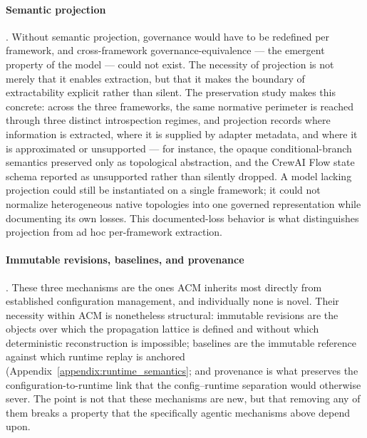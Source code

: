 \documentclass[10pt]{article}
\begin{document}
\paragraph{Semantic projection}. Without semantic projection, governance would have to be redefined per framework, and cross-framework governance-equivalence — the emergent property of the model — could not exist. The necessity of projection is not merely that it enables extraction, but that it makes the boundary of extractability explicit rather than silent. The preservation study makes this concrete: across the three frameworks, the same normative perimeter is reached through three distinct introspection regimes, and projection records where information is extracted, where it is supplied by adapter metadata, and where it is approximated or unsupported — for instance, the opaque conditional-branch semantics preserved only as topological abstraction, and the CrewAI Flow state schema reported as unsupported rather than silently dropped. A model lacking projection could still be instantiated on a single framework; it could not normalize heterogeneous native topologies into one governed representation while documenting its own losses. This documented-loss behavior is what distinguishes projection from ad hoc per-framework extraction.

\paragraph{Immutable revisions, baselines, and provenance}. These three mechanisms are the ones ACM inherits most directly from established configuration management, and individually none is novel. Their necessity within ACM is nonetheless structural: immutable revisions are the objects over which the propagation lattice is defined and without which deterministic reconstruction is impossible; baselines are the immutable reference against which runtime replay is anchored (Appendix~\ref{appendix:runtime_semantics}; and provenance is what preserves the configuration-to-runtime link that the config–runtime separation would otherwise sever. The point is not that these mechanisms are new, but that removing any of them breaks a property that the specifically agentic mechanisms above depend upon.
\end{document}
